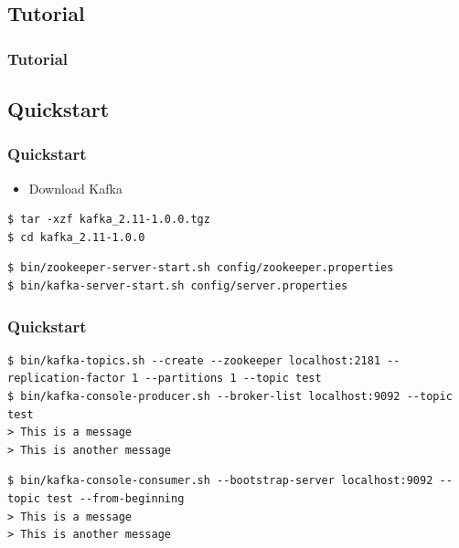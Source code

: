 \lstset{style=bashstyle}

\begin{frame}
\section{Tutorial}
\frametitle{Tutorial}
\tableofcontents[currentsection]
\end{frame}

\begin{frame}[fragile]
\subsection{Quickstart}
\frametitle{Quickstart}
\begin{itemize}
\item Download Kafka~\cite{KafkaDownload}
\end{itemize}
\begin{lstlisting}[]
$ tar -xzf kafka_2.11-1.0.0.tgz
$ cd kafka_2.11-1.0.0
\end{lstlisting}

\begin{lstlisting}[]
$ bin/zookeeper-server-start.sh config/zookeeper.properties
$ bin/kafka-server-start.sh config/server.properties
\end{lstlisting}
\end{frame}

\begin{frame}[fragile]
\frametitle{Quickstart}
\begin{lstlisting}[]
$ bin/kafka-topics.sh --create --zookeeper localhost:2181 --replication-factor 1 --partitions 1 --topic test
$ bin/kafka-console-producer.sh --broker-list localhost:9092 --topic test
> This is a message
> This is another message
\end{lstlisting}

\begin{lstlisting}[]
$ bin/kafka-console-consumer.sh --bootstrap-server localhost:9092 --topic test --from-beginning
> This is a message
> This is another message
\end{lstlisting}
\end{frame}

